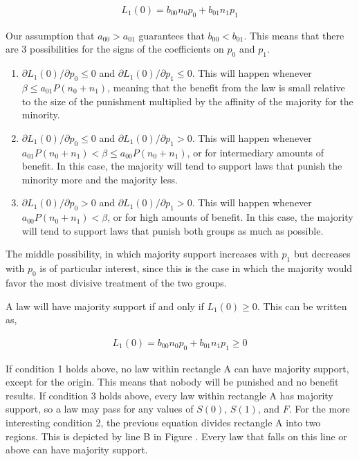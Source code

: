 \begin{align}
L_1(0) = b_{00}n_0p_0 + b_{01} n_1p_1 
\end{align}

Our assumption that $a_{00} > a_{01}$ guarantees that $b_{00} < b_{01}$.  This means that there are 3 possibilities for the signs of the coefficients on $p_0$ and $p_1$.

\begin{enumerate}
\item $\partial L_1(0) / \partial p_0 \leq 0$ and $\partial L_1(0) / \partial p_1 \leq 0$.  This will happen whenever $\beta \leq   a_{01}P(n_0 + n_1)  $, meaning that the benefit from the law is small relative to the size of the punishment multiplied by the affinity of the majority for the minority.
\item $\partial L_1(0) / \partial p_0 \leq 0$ and $\partial L_1(0) / \partial p_1 > 0$.  This will happen whenever $  a_{01}P(n_0 + n_1) < \beta  \leq a_{00}P(n_0 + n_1) $, or for intermediary amounts of benefit.  In this case, the majority will tend to support laws that punish the minority more and the majority less.
\item $\partial L_1(0) / \partial p_0 > 0$ and $\partial L_1(0) / \partial p_1 > 0$.  This will happen whenever $   a_{00}P(n_0 + n_1) < \beta$, or for high amounts of benefit.  In this case, the majority will tend to support laws that punish both groups as much as possible.
\end{enumerate}

The middle possibility, in which majority support increases with $p_1$ but decreases with $p_0$ is of particular interest, since this is the case in which the majority would favor the most divisive treatment of the two groups.

A law will have majority support if and only if $L_1(0) \geq 0$.  This can be written as,

\begin{align}
L_1(0) = b_{00}n_0p_0 + b_{01} n_1p_1 \geq 0
\end{align}

If condition 1 holds above, no law within rectangle A can have majority support, except for the origin.  This means that nobody will be punished and no benefit results.  If condition 3 holds above, every law within rectangle A has majority support, so a law may pass for any values of $S(0)$, $S(1)$, and $F$.  For the more interesting condition 2, the previous equation divides rectangle A into two regions.  This is depicted by line B in Figure .  Every law that falls on this line or above can have majority support.

